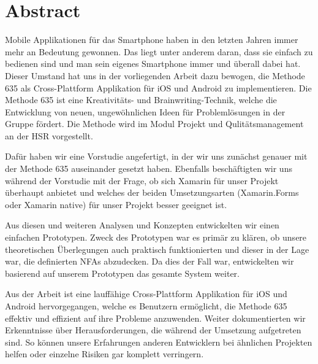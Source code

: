 \section{Abstract}
Mobile Applikationen für das Smartphone haben in den letzten Jahren immer mehr an Bedeutung gewonnen. Das liegt unter anderem daran, dass sie einfach zu bedienen sind und man sein eigenes Smartphone immer und überall dabei hat. Dieser Umstand hat uns in der vorliegenden Arbeit dazu bewogen, die Methode 635 als Cross-Plattform Applikation für iOS und Android zu implementieren. Die Methode 635 ist eine Kreativitäts- und Brainwriting-Technik, welche die Entwicklung von neuen, ungewöhnlichen Ideen für Problemlösungen in der Gruppe fördert. Die Methode wird im Modul \grqq Projekt und Qulitätsmanagement\grqq{} an der HSR vorgestellt.

Dafür haben wir eine Vorstudie angefertigt, in der wir uns zunächst genauer mit der Methode 635 auseinander gesetzt haben. Ebenfalls beschäftigten wir uns während der Vorstudie mit der Frage, ob sich Xamarin für unser Projekt überhaupt anbietet und welches der beiden Umsetzungsarten (Xamarin.Forms oder Xamarin native) für unser Projekt besser geeignet ist.

Aus diesen und weiteren Analysen und Konzepten entwickelten wir einen einfachen Prototypen. Zweck des Prototypen war es primär zu klären, ob unsere theoretischen Überlegungen auch praktisch funktionierten und dieser in der Lage war, die definierten NFAs abzudecken. Da dies der Fall war, entwickelten wir basierend auf unserem Prototypen das gesamte System weiter.

Aus der Arbeit ist eine lauffähige Cross-Plattform Applikation für iOS und Android hervorgegangen, welche es Benutzern ermöglicht, die Methode 635 effektiv und effizient auf ihre Probleme anzuwenden. Weiter dokumentierten wir Erkenntnisse über Herausforderungen, die während der Umsetzung aufgetreten sind. So können unsere Erfahrungen anderen Entwicklern bei ähnlichen Projekten helfen oder einzelne Risiken gar komplett verringern. 